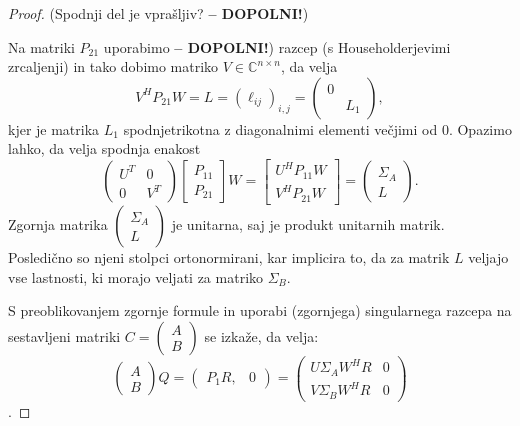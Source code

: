 \documentclass[mat1]{article}
\begin{document}
\begin{proof}
(Spodnji del je vprašljiv? \textbf{-- DOPOLNI!})

Na matriki $P_{21}$ uporabimo \textbf{-- DOPOLNI!}) razcep (s Householderjevimi zrcaljenji) in tako dobimo matriko $V \in \mathbb{C}^{n \times n}$, da velja $$ V^H P_{21} W = L = (\ell_{ij})_{i, j} =
\begin{pmatrix} 
0 &  \\
& L_1
\end{pmatrix}
,$$ kjer je matrika $L_1$ spodnjetrikotna z diagonalnimi elementi večjimi od $0$.
Opazimo lahko, da velja spodnja enakost
$$
\begin{pmatrix} 
U^T & 0 \\
0 & V^T
\end{pmatrix}
\begin{bmatrix}
P_{11} \\
P_{21}
\end{bmatrix} W = 
\begin{bmatrix}
U^H P_{11} W \\
V^H P_{21} W
\end{bmatrix} =
\begin{pmatrix}
\Sigma_A \\
L
\end{pmatrix}.
$$
Zgornja matrika $\begin{pmatrix}
\Sigma_A \\
L
\end{pmatrix}$ je unitarna, saj je produkt unitarnih matrik. Posledično so njeni stolpci ortonormirani, kar implicira to, da za matrik $L$ veljajo vse lastnosti, ki morajo veljati za matriko $\Sigma_B$.

S preoblikovanjem zgornje formule in uporabi (zgornjega) singularnega razcepa na sestavljeni matriki $C = 
\begin{pmatrix}
A \\
B
\end{pmatrix}$ se izkaže, da velja:
$$ 
\begin{pmatrix}
A \\
B
\end{pmatrix}
Q =
\left(\begin{array}{lr} P_1R, & 0 \end{array}\right)
=
\begin{pmatrix}
U \Sigma_A W^HR & 0 \\
V \Sigma_B W^HR & 0
\end{pmatrix}
$$.
\end{proof}


\end{document}
